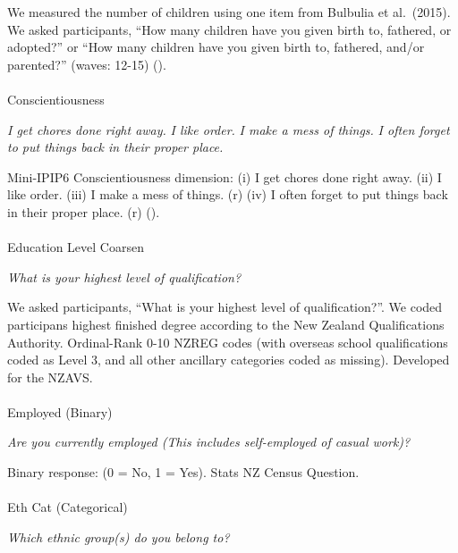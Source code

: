 \documentclass[
  single column]{article}
\makeatletter
\let\oldparagraph\paragraph
\renewcommand{\paragraph}{
    \@ifstar
      \xxxParagraphStar
      \xxxParagraphNoStar
  }
\newcommand{\xxxParagraphStar}[1]{\oldparagraph*{#1}\mbox{}}
\newcommand{\xxxParagraphNoStar}[1]{\oldparagraph{#1}\mbox{}}
\makeatother
\begin{document}
We measured the number of children using one item from Bulbulia et
al.~(2015). We asked participants, ``How many children have you given
birth to, fathered, or adopted?'' or ``How many children have you given
birth to, fathered, and/or parented?'' (waves: 12-15)
().

\paragraph{Conscientiousness}\label{conscientiousness}

\emph{I get chores done right away.} \emph{I like order.} \emph{I make a
mess of things.} \emph{I often forget to put things back in their proper
place.}

Mini-IPIP6 Conscientiousness dimension: (i) I get chores done right
away. (ii) I like order. (iii) I make a mess of things. (r) (iv) I often
forget to put things back in their proper place. (r)
().

\paragraph{Education Level Coarsen}\label{education-level-coarsen}

\emph{What is your highest level of qualification?}

We asked participants, ``What is your highest level of qualification?''.
We coded participans highest finished degree according to the New
Zealand Qualifications Authority. Ordinal-Rank 0-10 NZREG codes (with
overseas school qualifications coded as Level 3, and all other ancillary
categories coded as missing). Developed for the NZAVS.

\paragraph{Employed (Binary)}\label{employed-binary}

\emph{Are you currently employed (This includes self-employed of casual
work)?}

Binary response: (0 = No, 1 = Yes). Stats NZ Census Question.

\paragraph{Eth Cat (Categorical)}\label{eth-cat-categorical}

\emph{Which ethnic group(s) do you belong to?}
\end{document}
